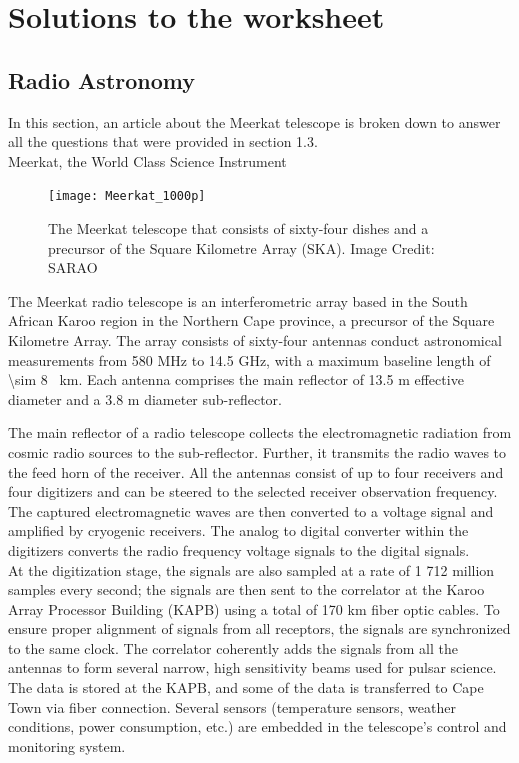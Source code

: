 \documentclass[12pt,a4paper]{report}
\begin{document}
	
	
	\chapter{Solutions to the worksheet}	
	
	\section{Radio Astronomy}
	
	In this section, an article about the Meerkat telescope is broken down to answer all the questions that were provided in section 1.3.\\
	
	{\noindent \large Meerkat, the World Class Science Instrument}	
	
	\begin{figure}[h]
		\centering
		\texttt{[image: Meerkat\_1000p]}
		\caption{The Meerkat telescope that consists of sixty-four dishes and a precursor of the Square Kilometre Array (SKA). Image Credit: SARAO}
		\label{fig:Meerkat}
	\end{figure}	 
	
	The Meerkat radio telescope is an interferometric array based in the South African Karoo region in the Northern Cape province, a precursor of the Square Kilometre Array. The array consists of sixty-four antennas conduct astronomical measurements from 580 MHz to 14.5 GHz, with a maximum baseline length of \SI{\sim 8 }{\kilo \meter}. Each antenna comprises the main reflector of 13.5 m effective diameter and a 3.8 m diameter sub-reflector.
	
	The main reflector of a radio telescope collects the electromagnetic radiation from cosmic radio sources to the sub-reflector. Further, it transmits the radio waves to the feed horn of the receiver.	All the antennas consist of up to four receivers and four digitizers and can be steered to the selected receiver observation frequency. The captured electromagnetic waves are then converted to a voltage signal and amplified by cryogenic receivers. The analog to digital converter within the digitizers converts the radio frequency voltage signals to the digital signals.\\
	
	At the digitization stage, the signals are also sampled at a rate of 1 712 million samples every second; the signals are then sent to the correlator at the Karoo Array Processor Building (KAPB) using a total of 170 km fiber optic cables. To ensure proper alignment of signals from all receptors, the signals are synchronized to the same clock. The correlator coherently adds the signals from all the antennas to form several narrow, high sensitivity beams used for pulsar science. The data is stored at the KAPB, and some of the data is transferred to Cape Town via fiber connection. Several sensors (temperature sensors, weather conditions, power consumption, etc.) are embedded in the telescope's control and monitoring system. \\
	
\end{document}
